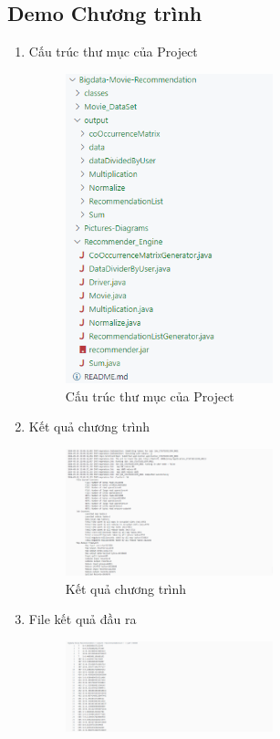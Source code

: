\subsection*{Demo Chương trình}
\begin{enumerate}
    \item Cấu trúc thư mục của Project
          \begin{figure}[h]
              \centering
              \includegraphics[width=6cm]{images/Demo2.png}
              \caption{Cấu trúc thư mục của Project}
          \end{figure}
          \pagebreak
    \item Kết quả chương trình
          \begin{figure}[ht]
              \centering
              \includegraphics[width=6cm]{images/Demo3.png}
              \caption{Kết quả chương trình}
          \end{figure}
    \item File kết quả đầu ra
          \begin{figure}[ht]
              \centering
              \includegraphics[width=6cm]{images/Demo4.png}

\end{figure}
\end{enumerate}
